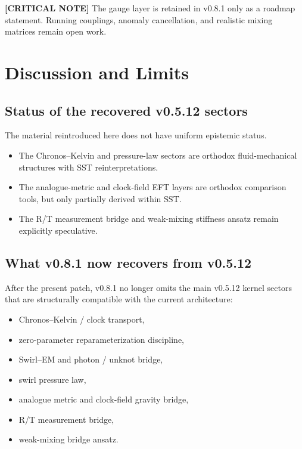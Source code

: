\documentclass[11pt]{article}
\theoremstyle{definition}
\theoremstyle{plain}
\theoremstyle{remark}
\begin{document}
        \textbf{[CRITICAL NOTE]} The gauge layer is retained in v0.8.1 only as a roadmap statement. Running couplings,
        anomaly cancellation, and realistic mixing matrices remain open work.

    \section{Discussion and Limits}
        \label{sec:discussion}

    \subsection{Status of the recovered v0.5.12 sectors}

        The material reintroduced here does not have uniform epistemic status.

        \begin{itemize}
            \item The Chronos--Kelvin and pressure-law sectors are orthodox fluid-mechanical structures with SST reinterpretations.
            \item The analogue-metric and clock-field EFT layers are orthodox comparison tools, but only partially derived within SST.
            \item The R/T measurement bridge and weak-mixing stiffness ansatz remain explicitly speculative.
        \end{itemize}

    \subsection{What v0.8.1 now recovers from v0.5.12}

        After the present patch, v0.8.1 no longer omits the main v0.5.12 kernel sectors that are structurally compatible with the current architecture:
        \begin{itemize}
            \item Chronos--Kelvin / clock transport,
            \item zero-parameter reparameterization discipline,
            \item Swirl--EM and photon / unknot bridge,
            \item swirl pressure law,
            \item analogue metric and clock-field gravity bridge,
            \item R/T measurement bridge,
            \item weak-mixing bridge ansatz.
        \end{itemize}
\end{document}
